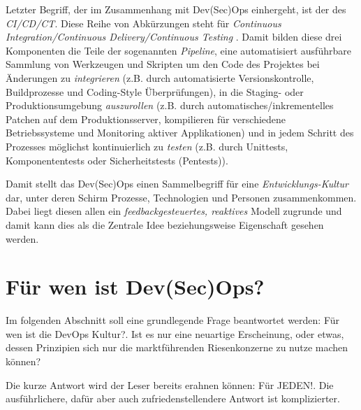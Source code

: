 Letzter Begriff, der im Zusammenhang mit Dev(Sec)Ops einhergeht, ist der des \emph{CI/CD/CT}. Diese Reihe von Abkürzungen steht für \emph{Continuous Integration/Continuous Delivery/Continuous Testing} \cite{kinsbrunerHowMakeCI2018}. Damit bilden diese drei Komponenten die Teile der sogenannten \emph{Pipeline}, eine automatisiert ausführbare Sammlung von Werkzeugen und Skripten um den Code des Projektes bei Änderungen zu \emph{integrieren} (z.B. durch automatisierte Versionskontrolle, Buildprozesse und Coding-Style Überprüfungen), in die Staging- oder Produktionsumgebung \emph{auszurollen} (z.B. durch automatisches/inkrementelles Patchen auf dem Produktionsserver, kompilieren für verschiedene Betriebssysteme und Monitoring aktiver Applikationen) und in jedem Schritt des Prozesses möglichst kontinuierlich zu \emph{testen} (z.B. durch Unittests, Komponententests oder Sicherheitstests (Pentests)). 

Damit stellt das Dev(Sec)Ops einen Sammelbegriff für eine \emph{Entwicklungs-Kultur} \cite{kolblSoftwareentwicklungMitDev2021} dar, unter deren Schirm Prozesse, Technologien und Personen zusammenkommen. Dabei liegt diesen allen ein \emph{feedbackgesteuertes, reaktives} Modell zugrunde und damit kann dies als die Zentrale Idee beziehungsweise Eigenschaft gesehen werden.

\section{Für wen ist Dev(Sec)Ops?}

Im folgenden Abschnitt soll eine grundlegende Frage beantwortet werden: \glqq Für wen ist die DevOps Kultur?\grqq{}. 
Ist es nur eine neuartige Erscheinung, oder etwas, dessen Prinzipien sich nur die marktführenden Riesenkonzerne zu nutze machen können?

Die kurze Antwort wird der Leser bereits erahnen können: \glqq Für JEDEN!\grqq{}. Die ausführlichere, dafür aber auch zufriedenstellendere Antwort ist komplizierter. 

